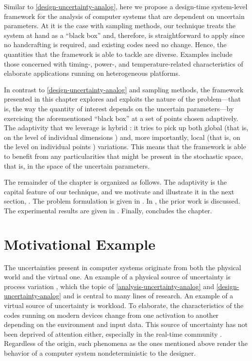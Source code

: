Similar to \cref{design-uncertainty-analog}, here we propose a design-time
system-level framework for the analysis of computer systems that are dependent
on uncertain parameters. At it is the case with sampling methods, our technique
treats the system at hand as a ``black box'' and, therefore, is straightforward
to apply since no handcrafting is required, and existing codes need no change.
Hence, the quantities that the framework is able to tackle are diverse. Examples
include those concerned with timing-, power-, and temperature-related
characteristics of elaborate applications running on heterogeneous platforms.

In contrast to \cref{design-uncertainty-analog} and sampling methods, the
framework presented in this chapter explores and exploits the nature of the
problem---that is, the way the quantity of interest depends on the uncertain
parameters---by exercising the aforementioned ``black box'' at a set of points
chosen adaptively. The adaptivity that we leverage is hybrid \cite{jakeman2012}:
it tries to pick up both global (that is, on the level of individual dimensions
\cite{klimke2006}) and, more importantly, local (that is, on the level on
individual points \cite{ma2009}) variations. This means that the framework is
able to benefit from any particularities that might be present in the stochastic
space, that is, in the space of the uncertain parameters.

The remainder of the chapter is organized as follows. The adaptivity is the
capital feature of our technique, and we motivate and illustrate it in the next
section, . The problem formulation is given in
. In , the prior work is
discussed. The experimental results are given in .
Finally,  concludes the chapter.

\section{Motivational Example}

The uncertainties present in computer systems originate from both the physical
world and the virtual one. An example of a physical source of uncertainty is
process variation \cite{srivastava2010}, which the topic of
\cref{analysis-uncertainty-analog} and \cref{design-uncertainty-analog} and is
central to many lines of research. An example of a virtual source of uncertainty
is workload. To elaborate, the characteristics of the codes running on modern
devices change from one activation to another depending on the environment and
input data. This source of uncertainty has not been deprived of attention
either, especially in the real-time community \cite{quinton2012, diaz2002,
santinelli2011, tanasa2015}. Regardless of the origin, such phenomena as the
ones mentioned above render the behavior of a computer system nondeterministic
to the designer.

